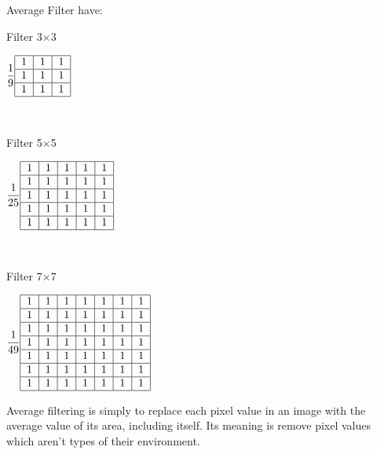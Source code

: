 Average Filter have: 
\begin{center}
	Filter 3$\times$3

$\dfrac{1}{9}\begin{tabular}{|c|c|c|}
\hline 
1 & 1 & 1 \\ 
\hline 
1 & 1 & 1 \\ 
\hline 
1 & 1 & 1 \\ 
\hline 
\end{tabular}$ 	
\end{center}

\

\begin{center}
		Filter 5$\times$5
	
	$\dfrac{1}{25}\begin{tabular}{|c|c|c|c|c|}
		\hline 
		1 & 1 & 1 & 1 & 1 \\ 
		\hline 
		1 & 1 & 1 & 1 & 1 \\ 
		\hline 
		1 & 1 & 1 & 1 & 1 \\ 
		\hline 
		1 & 1 & 1 & 1 & 1 \\ 
		\hline 
		1 & 1 & 1 & 1 & 1 \\ 
		\hline 
	\end{tabular} $
\end{center}

\

\begin{center}
	Filter 7$\times$7

$\dfrac{1}{49}\begin{tabular}{|c|c|c|c|c|c|c|}
	\hline 
	1 & 1 & 1 & 1 & 1 & 1 & 1 \\ 
	\hline 
	1 & 1 & 1 & 1 & 1 & 1 & 1 \\ 
	\hline 
	1 & 1 & 1 & 1 & 1 & 1 & 1 \\ 
	\hline 
	1 & 1 & 1 & 1 & 1 & 1 & 1 \\ 
	\hline 
	1 & 1 & 1 & 1 & 1 & 1 & 1 \\ 
	\hline 
	1 & 1 & 1 & 1 & 1 & 1 & 1 \\ 
	\hline 
	1 & 1 & 1 & 1 & 1 & 1 & 1 \\ 
	\hline 
\end{tabular} $
\end{center}
\vspace{1cm}

Average filtering is simply to replace each pixel value in an image with the average value of its area, including itself. Its meaning is remove pixel values which aren't types of their environment.

